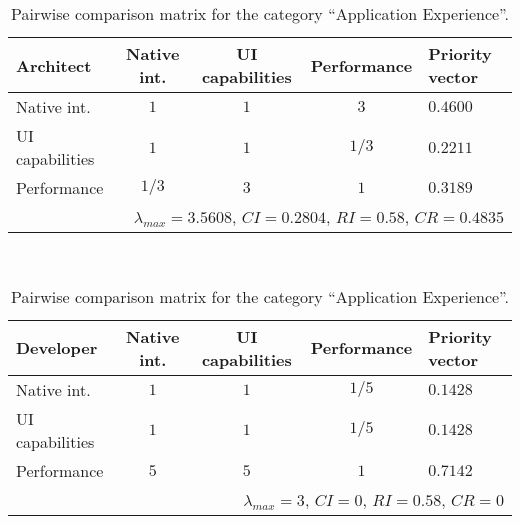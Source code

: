 \begin{table}[h]
    \begin{center}
        \begin{tabular}{lcccl}
            \hline
            \textbf{Architect}     & Native int. & UI capabilities & Performance & Priority vector \\ 
            \hline
            Native int.            & $1$         & $1$             & $3$         & $0.4600$        \\
            UI capabilities        & $1$         & $1$             & $1/3$       & $0.2211$        \\
            Performance            & $1/3$       & $3$             & $1$         & $0.3189$        \\
            \hline
            \multicolumn{5}{r}{$\lambda_{max} = 3.5608$, $CI = 0.2804$, $RI = 0.58$, $CR = 0.4835$}\\
            \hline
        \end{tabular}
        \\\vspace{1em}
        \begin{tabular}{lcccl}
            \hline
            \textbf{Developer}     & Native int. & UI capabilities & Performance & Priority vector \\ 
            \hline
            Native int.            & $1$         & $1$             & $1/5$       & $0.1428$        \\
            UI capabilities        & $1$         & $1$             & $1/5$       & $0.1428$        \\
            Performance            & $5$         & $5$             & $1$         & $0.7142$        \\
            \hline
            \multicolumn{5}{r}{$\lambda_{max} = 3$, $CI = 0$, $RI = 0.58$, $CR = 0$}               \\
            \hline
        \end{tabular}
        \caption{Pairwise comparison matrix for the category ``Application Experience''.}
        \label{tab:ae}
    \end{center}
\end{table}

